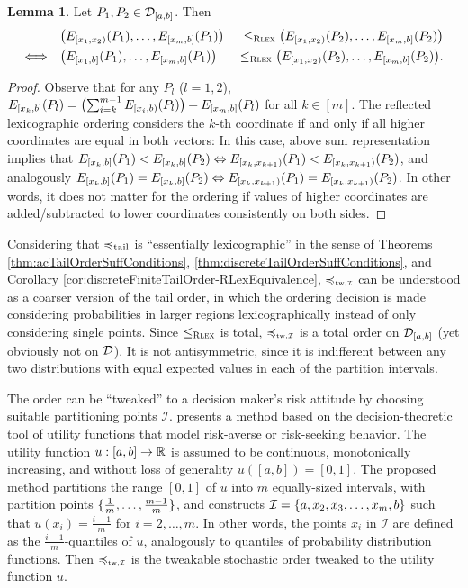 \documentclass[a4paper,DIV=11]{scrreprt}
\theoremstyle{definition}
\newtheorem{lemma}[thm]{Lemma} %
\begin{document}
    \begin{lemma}
        Let $P_1, P_2 \in \mathcal{D}_{[a, b]}$.
        Then
        \begin{alignat*}{3}
                                     &\bigl(E_{[x_1, x_2)}(P_{1}), \dots, E_{[x_m, b]}(P_1)\bigr)\; &\leq_{\textsc{Rlex}} \bigl(E_{[x_1, x_2)}(P_2), \dots, E_{[x_m, b]}(P_2)\bigr) \\
            \Longleftrightarrow\quad &\bigl(E_{[x_1, b]}(P_{1}), \dots, E_{[x_m, b]}(P_1)\bigr) &\leq_{\textsc{Rlex}} \bigl(E_{[x_1, x_2)}(P_2), \dots, E_{[x_m, b]}(P_2)\bigr).
        \end{alignat*}
    \end{lemma}
    \begin{proof}
        Observe that for any $P_l$ ($l = 1, 2$), $E_{[x_k, b]}(P_l) = \bigl(\sum_{i=k}^{m-1} E_{[x_i, b)}(P_l)\bigr) + E_{[x_m, b]}(P_l)$ for all $k \in [m]$.
        The reflected lexicographic ordering considers the $k$-th coordinate if and only if all higher coordinates are equal in both vectors:
        In this case, above sum representation implies that $E_{[x_k, b]}(P_1) < E_{[x_k, b]}(P_2) \Leftrightarrow E_{[x_k, x_{k+1})}(P_1) < E_{[x_k, x_{k+1})}(P_2)$, and analogously $E_{[x_k, b]}(P_1) = E_{[x_k, b]}(P_2) \Leftrightarrow E_{[x_k, x_{k+1})}(P_1) = E_{[x_k, x_{k+1})}(P_2)$.
        In other words, it does not matter for the ordering if values of higher coordinates are added/subtracted to lower coordinates consistently on both sides.
    \end{proof}

    Considering that $\preccurlyeq_{\text{tail}}$ is “essentially lexicographic” in the sense of Theorems \ref{thm:acTailOrderSuffConditions}, \ref{thm:discreteTailOrderSuffConditions}, and Corollary \ref{cor:discreteFiniteTailOrder-RLexEquivalence},
    $\leqtw$ can be understood as a coarser version of the tail order, in which the ordering decision is made considering probabilities in larger regions lexicographically instead of only considering single points.
    Since $\leq_{\textsc{Rlex}}$ is total, $\leqtw$ is a total order on $\mathcal{D}_{[a, b]}$ (yet obviously not on $\mathcal{D}$). It is not antisymmetric, since it is indifferent between any two distributions with equal expected values in each of the partition intervals.
    
    The order can be “tweaked” to a decision maker's risk attitude by choosing suitable partitioning points $\mathcal{I}$. \cite{bib:tweakableStochasticOrders} presents a method based on the decision-theoretic tool of utility functions that model risk-averse or risk-seeking behavior.    
    The utility function $u: [a, b] \to \mathbb{R}$ is assumed to be continuous, monotonically increasing, and without loss of generality $u([a, b]) = [0, 1]$.
    The proposed method partitions the range $[0, 1]$ of $u$ into $m$ equally-sized intervals, with partition points $\{\frac{1}{m}, \dots, \frac{m-1}{m}\}$, and constructs $\mathcal{I} = \{a, x_2, x_3, \dots, x_m, b\}$ such that $u(x_i) = \frac{i-1}{m}$ for $i = 2, \dots, m$.
    In other words, the points $x_i$ in $\mathcal{I}$ are defined as the $\frac{i-1}{m}$-quantiles of $u$, analogously to quantiles of probability distribution functions. Then $\leqtw$ is the tweakable stochastic order tweaked to the utility function $u$.
    
\end{document}
